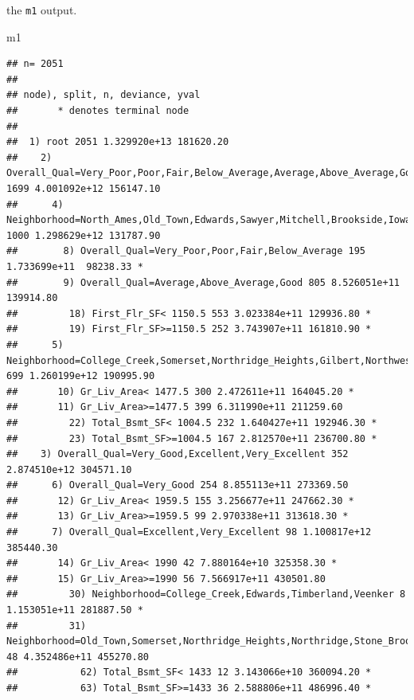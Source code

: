\documentclass[
  10pt,
  ignorenonframetext,
]{beamer}
\newenvironment{Shaded}{}{}
\newcommand{\NormalTok}[1]{#1}
\begin{document}
\begin{frame}[fragile]{the \texttt{m1} output.}
\protect\hypertarget{the-m1-output.}{}

\begin{Shaded}
\begin{Highlighting}[]
\NormalTok{m1}
\end{Highlighting}
\end{Shaded}

\begin{verbatim}
## n= 2051 
## 
## node), split, n, deviance, yval
##       * denotes terminal node
## 
##  1) root 2051 1.329920e+13 181620.20  
##    2) Overall_Qual=Very_Poor,Poor,Fair,Below_Average,Average,Above_Average,Good 1699 4.001092e+12 156147.10  
##      4) Neighborhood=North_Ames,Old_Town,Edwards,Sawyer,Mitchell,Brookside,Iowa_DOT_and_Rail_Road,South_and_West_of_Iowa_State_University,Meadow_Village,Briardale,Northpark_Villa,Blueste 1000 1.298629e+12 131787.90  
##        8) Overall_Qual=Very_Poor,Poor,Fair,Below_Average 195 1.733699e+11  98238.33 *
##        9) Overall_Qual=Average,Above_Average,Good 805 8.526051e+11 139914.80  
##         18) First_Flr_SF< 1150.5 553 3.023384e+11 129936.80 *
##         19) First_Flr_SF>=1150.5 252 3.743907e+11 161810.90 *
##      5) Neighborhood=College_Creek,Somerset,Northridge_Heights,Gilbert,Northwest_Ames,Sawyer_West,Crawford,Timberland,Northridge,Stone_Brook,Clear_Creek,Bloomington_Heights,Veenker,Green_Hills 699 1.260199e+12 190995.90  
##       10) Gr_Liv_Area< 1477.5 300 2.472611e+11 164045.20 *
##       11) Gr_Liv_Area>=1477.5 399 6.311990e+11 211259.60  
##         22) Total_Bsmt_SF< 1004.5 232 1.640427e+11 192946.30 *
##         23) Total_Bsmt_SF>=1004.5 167 2.812570e+11 236700.80 *
##    3) Overall_Qual=Very_Good,Excellent,Very_Excellent 352 2.874510e+12 304571.10  
##      6) Overall_Qual=Very_Good 254 8.855113e+11 273369.50  
##       12) Gr_Liv_Area< 1959.5 155 3.256677e+11 247662.30 *
##       13) Gr_Liv_Area>=1959.5 99 2.970338e+11 313618.30 *
##      7) Overall_Qual=Excellent,Very_Excellent 98 1.100817e+12 385440.30  
##       14) Gr_Liv_Area< 1990 42 7.880164e+10 325358.30 *
##       15) Gr_Liv_Area>=1990 56 7.566917e+11 430501.80  
##         30) Neighborhood=College_Creek,Edwards,Timberland,Veenker 8 1.153051e+11 281887.50 *
##         31) Neighborhood=Old_Town,Somerset,Northridge_Heights,Northridge,Stone_Brook 48 4.352486e+11 455270.80  
##           62) Total_Bsmt_SF< 1433 12 3.143066e+10 360094.20 *
##           63) Total_Bsmt_SF>=1433 36 2.588806e+11 486996.40 *
\end{verbatim}

\end{frame}
\end{document}
